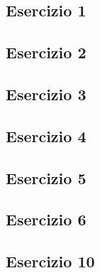 \vspace{0.8cm}
\subsection{\textbf{Esercizio 1}}

\vspace{1cm}
\subsection{\textbf{Esercizio 2}}

\vspace{1cm}
\subsection{\textbf{Esercizio 3}}

\vspace{1cm}
\subsection{\textbf{Esercizio 4}}

\vspace{1cm}
\subsection{\textbf{Esercizio 5}}

\vspace{1cm}
\subsection{\textbf{Esercizio 6}}


\vspace{1cm}
\subsection{\textbf{Esercizio 10}}

